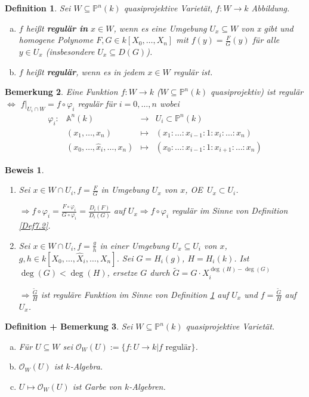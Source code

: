 \documentclass[a4paper, 12pt, numbers=noendperiod, chapterprefix=true]{scrbook}
\theoremstyle{break}
\newtheorem{Def}{Definition}[section]
\newtheorem{DefBem}[Def]{Definition + Bemerkung}
\newtheorem{Bem}[Def]{Bemerkung}
\theoremstyle{nonumberbreak}
\newtheorem{Bew}{Beweis}
\theoremstyle{nonumberplain}
\newcommand{\quot}[1]{\textrm{\glqq}{#1}\textrm{\grqq}}
\newcommand{\emp}[1]{\textbf{\emph{#1}}}
\newcommand{\defterm}[1]{{\index{#1}}\emp{#1}}
\newcommand{\deftermspec}[2]{{\index{#2}}\emp{#1}}
\newenvironment{twosidedproof}{\begin{enumerate}[\quot{$\Rightarrow$}:]}{\end{enumerate}}
\newcommand{\proofforward}{\item[\quot{$\Rightarrow$}:]}
\newcommand{\proofreverse}{\item[\quot{$\Leftarrow$}:]}
\newcommand{\A}{\mathbb{A}}
\newcommand{\IP}{\mathbb{P}}%
\newcommand{\calO}{\mathcal{O}}
\renewcommand{\OE}{O\!\!E~}
\begin{document}
\begin{Def}\label{Def12.2}
Sei $W\subseteq\IP^n(k)$ quasiprojektive Variet\"at, $f:W\to k$ Abbildung.\begin{enumerate}[a)]
\item
	$f$ hei\ss t \deftermspec{regul\"ar in}{regul\"ar!in $x$} $x\in W$, wenn es eine Umgebung $U_x\subseteq W$ von x gibt und homogene Polynome $F, G \in k[X_0,\ldots ,X_n]$ mit $f(y)=\frac{F}{G}(y)$ f\"ur alle $y\in U_x$ (insbesondere $U_x\subseteq D(G)$).

\item
	$f$ hei\ss t \defterm{regul\"ar}, wenn es in jedem $x\in W$ regul\"ar ist.
\end{enumerate}\end{Def}

\begin{Bem}
Eine Funktion $f:W \to k$ ($W\subseteq\IP^n(k)$ quasiprojektiv) ist regul\"ar $\Leftrightarrow$ $f|_{U_i\cap W}=f\circ \varphi_i$ regul\"ar f\"ur $i=0,\ldots ,n$ wobei
	\[\begin{array}{lrcl}
		\varphi_i: & \A^n(k) &\to& U_i\subset \IP^n(k)\\
		& (x_1,\ldots ,x_n) & \mapsto & (x_1:\ldots :x_{i-1}:1:x_i:\ldots :x_n)\\
		& (x_0,\ldots ,\hat x_i,\ldots ,x_n) &\mapsto& (x_0:\ldots :x_{i-1}:1:x_{i+1}:\ldots :x_n)
	\end{array}\]
\end{Bem}

\begin{Bew}\begin{twosidedproof}
\proofforward
	Sei  $x\in W\cap U_i, f=\frac{F}{G}$ in Umgebung $U_x$ von $x$, \OE $U_x\subset U_i$.
	
	$\Rightarrow f\circ \varphi_i=\frac{F\circ \varphi_i}{G\circ \varphi_i}=\frac{D_i(F)}{D_i(G)}$ auf $U_x \Rightarrow f\circ \varphi_i$ regul\"ar im Sinne von Definition \ref{Def7.2}.
\proofreverse
	Sei $x\in W\cap U_i, f=\frac{g}{h}$ in einer Umgebung $U_x\subseteq U_i$ von $x$, $g,h\in k[X_0,\ldots ,\widehat X_i,\ldots ,X_n]$. Sei $G=H_i(g)$, $H=H_i(k)$. Ist $\deg(G)<\deg(H)$, ersetze $G$ durch $\widetilde G=G\cdot X_i^{\deg(H)-\deg(G)}$
	
	$\Rightarrow \frac{\widetilde G}{H}$ ist regul\"are Funktion im Sinne von Definition \ref{Def12.2} auf $U_x$ und $f=\frac{\widetilde G}{H}$ auf $U_x$.
\end{twosidedproof}\end{Bew}

\begin{DefBem}
Sei $W\subseteq\IP^n(k)$ quasiprojektive Variet\"at.\begin{enumerate}[a)]
\item
	F\"ur $U\subseteq W$ sei $\calO_W(U):=\{f:U\to k\vert f \text{ regul\"ar}\}$.
\item
	$\calO_W(U)$ ist $k$-Algebra.
\item
	$U\mapsto\calO_W(U)$ ist Garbe von $k$-Algebren.
\end{enumerate}\end{DefBem}
\end{document}
